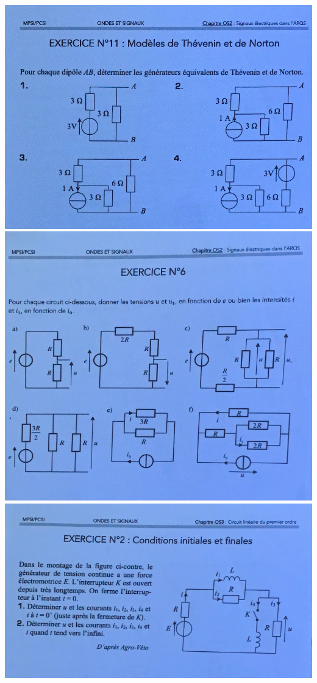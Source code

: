 \documentclass{article}
\begin{document}
\vspace{0.1cm}
\includegraphics[scale=0.3]{assets/physique/kholle3-1.png}
\hspace{0.1cm}
\includegraphics[scale=0.3]{assets/physique/kholle3-2.png} \\

\vspace{0.1cm}
\hspace{3cm}
\includegraphics[scale=0.4]{assets/physique/kholle3-3.png} \\
\end{document}
